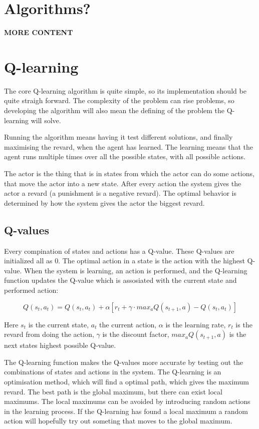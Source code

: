 \documentclass{article}
\begin{document}
\section{Algorithms?}
\textbf{MORE CONTENT}



\section{Q-learning}
The core Q-learning algorithm is quite simple, so its implementation should
be quite straigh forward. The complexity of the problem can rise problems,
so developing the algorithm will also mean the defining of
the problem the Q-learning will solve.

Running the algorithm means having it test different solutions, and finally
maximising the revard, when the agent has learned. The learning means
that the agent runs multiple times over all the possible states,
with all possible actions.

The actor is the thing that is in states from which the actor can do some
actions, that move the actor into a new state. After every action the
system gives the actor a revard (a punishment is a negative revard).
The optimal behavior is determined by how the system gives the actor the
biggest revard.


\subsection{Q-values}
Every compination of states and actions has a Q-value. These Q-values are
initialized all as 0. The optimal action in a state is the action with the
highest Q-value. When the system is learning, an action is performed, and the
Q-learning function updates the Q-value which is assosiated with the current
state and performed action:

\[Q(s_t, a_t) = Q(s_t, a_t) + \alpha [ r_t + \gamma \cdot max_aQ(s_{t+1}, a)
- Q(s_t, a_t) ]\]

Here $s_t$ is the current state, $a_t$ the current action,
$\alpha$ is the learning rate, $r_t$ is the revard from doing the action,
$\gamma$ is the discount factor, $max_aQ(s_{t+1}, a)$ is the next states
highest possible Q-value.

The Q-learning function makes the Q-values more accurate by testing out
the combinations of states and actions in the system. The Q-learning is an
optimisation method, which will find a optimal path, which gives the maximum
revard. The best path is the global maximum, but there can exist local maximums.
The local maximums can be avoided by introducing random actions in the learning
process. If the Q-learning has found a local maximum a random action will
hopefully try out someting that moves to the global maximum.
\end{document}
